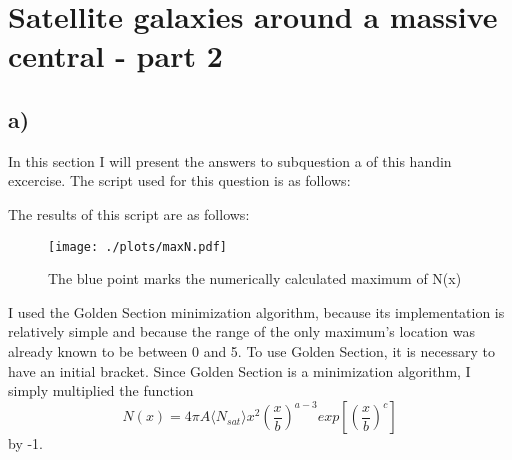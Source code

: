 \section{Satellite galaxies around a massive central - part 2}
\subsection*{a)}
In this section I will present the answers to subquestion a of this handin excercise. The script used for this question is as follows:

The results of this script are as follows:

\begin{figure}[H]
    \centering
    \texttt{[image: ./plots/maxN.pdf]}
    \caption{The blue point marks the numerically calculated maximum of N(x)}
    \label{fig:maxN}
\end{figure}
I used the Golden Section minimization algorithm, because its implementation is relatively simple and because the range of the only maximum's location was already known to be between 0 and 5. To use Golden Section, it is necessary to have an initial bracket. Since Golden Section is a minimization algorithm, I simply multiplied the function 
\begin{equation}
    N(x) = 4\pi A \langle N_{sat} \rangle x^2 \left(\frac{x}{b}\right)^{a-3}exp[\left(\frac{x}{b}\right)^c]
\end{equation}
by -1.

